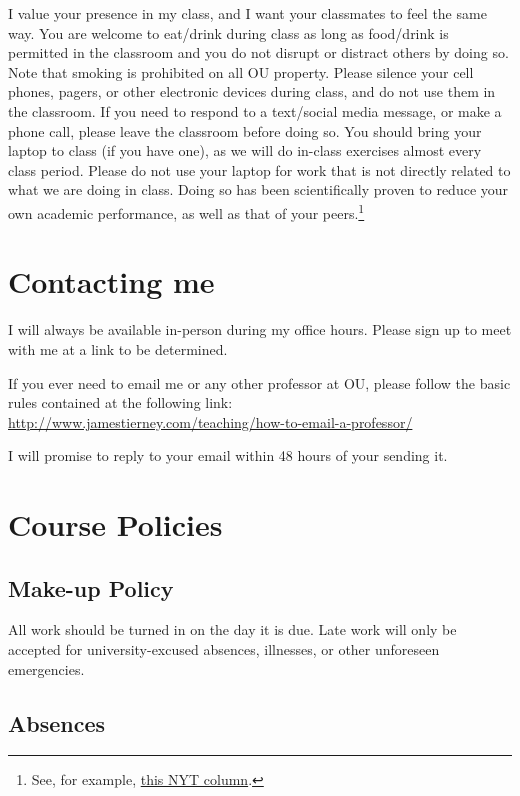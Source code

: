 \documentclass[11pt,english]{article}
\begin{document}
I value your presence in my class, and I want your classmates to feel the same way. You are welcome to eat/drink during class as long as food/drink is permitted in the classroom and you do not disrupt or distract others by doing so. Note that smoking is prohibited on all OU property. Please silence your cell phones, pagers, or other electronic devices during class, and do not use them in the classroom. If you need to respond to a text/social media message, or make a phone call, please leave the classroom before doing so. 
You should bring your laptop to class (if you have one), as we will do in-class exercises almost every class period. Please do not use your laptop for work that is not directly related to what we are doing in class. Doing so has been scientifically proven to reduce your own academic performance, as well as that of your peers.\footnote{See, for example, \href{https://www.nytimes.com/2017/11/22/business/laptops-not-during-lecture-or-meeting.html}{this NYT column}.}

\section*{Contacting me}
I will always be available in-person during my office hours. Please sign up to meet with me at a link to be determined.

If you ever need to email me or any other professor at OU, please follow the basic rules contained at the following link: \url{http://www.jamestierney.com/teaching/how-to-email-a-professor/}

I will promise to reply to your email within 48 hours of your sending it. 

\section*{Course Policies}

\subsection*{Make-up Policy}

All work should be turned in on the day it is due. Late work will only be accepted for university-excused absences, illnesses, or other unforeseen emergencies.

\subsection*{Absences}
\end{document}
